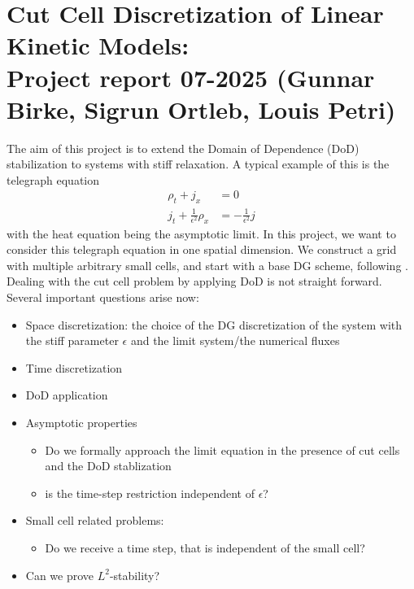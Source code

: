 \documentclass[]{article}
\title{}
\author{}
\date{}
\begin{document}
\section*{Cut Cell Discretization of Linear Kinetic Models:\\ Project report 07-2025 (Gunnar Birke, Sigrun Ortleb, Louis Petri)}


The aim of this project is to extend the Domain of Dependence (DoD) stabilization to systems with stiff relaxation.  A typical example of this is the telegraph equation
\begin{equation}
\begin{split}
	\rho_t + j_x & = 0\\
	j_t + \frac{1}{\epsilon^2}\rho_x & = -\frac{1}{\epsilon^2} j
\end{split}
\end{equation}
with the heat equation being the asymptotic limit.
In this project, we want to consider this telegraph equation in one spatial dimension. We construct a grid with multiple arbitrary small cells, and start with a base DG scheme, following \cite{Jang}.
Dealing with the cut cell problem by applying DoD is not straight forward. Several important questions arise now:
\vspace{\baselineskip}
\begin{itemize}
\item Space discretization: the choice of the DG discretization of the system with the stiff parameter $\epsilon$ and the limit system/the numerical fluxes
\item Time discretization
\item DoD application
\item Asymptotic properties
\begin{itemize}
\item Do we formally approach the limit equation in the presence of cut cells and the DoD stablization
\item is the time-step restriction independent of  $\epsilon$?
\end{itemize}
\item Small cell related problems:
\begin{itemize}
	\item Do we receive a time step, that is independent of the small cell?
\end{itemize}
\item Can we prove $L^2$-stability?
\end{itemize}
\vspace{\baselineskip}
\end{document}
